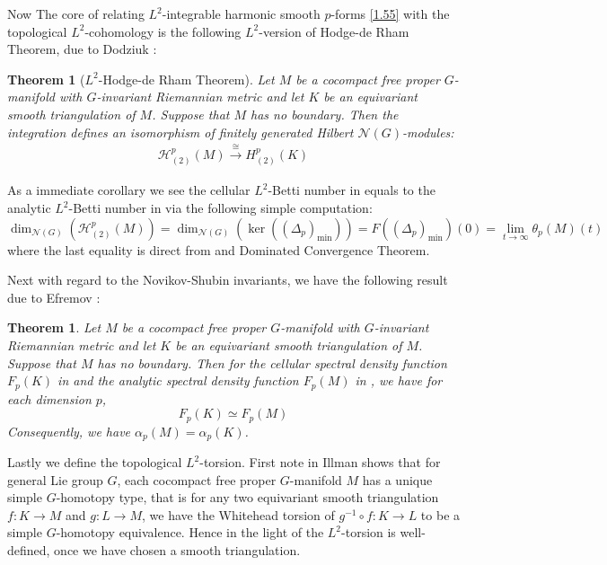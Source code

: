 \documentclass[11pt]{report}
\theoremstyle{definition}
\theoremstyle{plain}
\newtheorem{Theo}[Def]{Theorem}
\newcommand{\vna}{\mathcal{N}}
\begin{document}
Now The core of relating $L^2$-integrable harmonic smooth $p$-forms \ref{1.55} with the topological $L^2$-cohomology is the following $L^2$-version of Hodge-de Rham Theorem, due to Dodziuk \cite{dodziuk1977}:
\begin{Theo}[$L^2$-Hodge-de Rham Theorem]
	\label{l2hdr} Let $M$ be a cocompact free proper $G$-manifold with $G$-invariant Riemannian metric and let $K$ be an equivariant smooth triangulation of $M$. Suppose that $M$ has no boundary. Then the integration defines an isomorphism of finitely generated Hilbert $\mathcal{N}(G)$-modules:
	\begin{align*}
	\mathcal{H}_{(2)}^p(M)\overset{\cong}{\longrightarrow} H^p_{(2)}(K)
	\end{align*}
\end{Theo}
As a immediate corollary we see the cellular $L^2$-Betti number in  equals to the analytic $L^2$-Betti number in  via the following simple computation:
\begin{equation*}
\dim_{\vna(G)}(\mathcal{H}_{(2)}^p(M))=\dim_{\vna(G)}(\ker((\Delta_p)_{\min}))=F((\Delta_p)_{\min})(0)=\lim_{t\to \infty}\theta_p(M)(t)
\end{equation*}
where the last equality is direct from  and Dominated Convergence Theorem.
\par Next with regard to the Novikov-Shubin invariants, we have the following result due to Efremov \cite{efremov1991}:
\begin{Theo}\label{2.68}
	Let $M$ be a cocompact free proper $G$-manifold with $G$-invariant Riemannian metric and let $K$ be an equivariant smooth triangulation of $M$. Suppose that $M$ has no boundary. Then for the cellular spectral density function $F_p(K)$ in  and the analytic spectral density function $F_p(M)$ in , we have for each dimension $p$, 
	\begin{equation*}
	F_p(K)\simeq F_p(M)
	\end{equation*}
	Consequently, we have $\alpha_p(M)=\alpha_p(K)$.
\end{Theo}
Lastly we define the topological $L^2$-torsion. First note in \cite[Theorem~III]{illman2000} Illman shows that for general Lie group $G$,  each cocompact free proper $G$-manifold $M$ has a unique simple $G$-homotopy type, that is for any two equivariant smooth triangulation $f: K\to M$ and $g:L\to M$, we have the Whitehead torsion of $g^{-1}\circ f: K\to L$ to be a simple $G$-homotopy equivalence. Hence in the light of  the $L^2$-torsion is well-defined, once we have chosen a smooth triangulation. 
\end{document}
